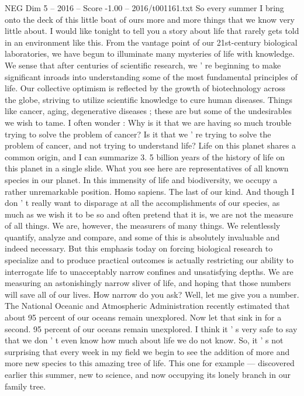 \begin{textsample}{NEG Dim 5 – 2016 – Score -1.00 – 2016/t001161.txt}
So every summer I bring onto the deck of this little boat of ours more and more things that we know very little about.
I would like tonight to tell you a story about life that rarely gets told in an environment like this.
From the vantage point of our 21st-century biological laboratories, we have begun to illuminate many mysteries of life with knowledge.
We sense that after centuries of scientific research, we ' re beginning to make significant inroads into understanding some of the most fundamental principles of life.
Our collective optimism is reflected by the growth of biotechnology across the globe, striving to utilize scientific knowledge to cure human diseases.
Things like cancer, aging, degenerative diseases ; these are but some of the undesirables we wish to tame.
I often wonder : Why is it that we are having so much trouble trying to solve the problem of cancer?
Is it that we ' re trying to solve the problem of cancer, and not trying to understand life?
Life on this planet shares a common origin, and I can summarize 3. 5 billion years of the history of life on this planet in a single slide.
What you see here are representatives of all known species in our planet.
In this immensity of life and biodiversity, we occupy a rather unremarkable position.
Homo sapiens.
The last of our kind.
And though I don ' t really want to disparage at all the accomplishments of our species, as much as we wish it to be so and often pretend that it is, we are not the measure of all things.
We are, however, the measurers of many things.
We relentlessly quantify, analyze and compare, and some of this is absolutely invaluable and indeed necessary.
But this emphasis today on forcing biological research to specialize and to produce practical outcomes is actually restricting our ability to interrogate life to unacceptably narrow confines and unsatisfying depths.
We are measuring an astonishingly narrow sliver of life, and hoping that those numbers will save all of our lives.
How narrow do you ask?
Well, let me give you a number.
The National Oceanic and Atmospheric Administration recently estimated that about 95 percent of our oceans remain unexplored.
Now let that sink in for a second. 95 percent of our oceans remain unexplored.
I think it ' s very safe to say that we don ' t even know how much about life we do not know.
So, it ' s not surprising that every week in my field we begin to see the addition of more and more new species to this amazing tree of life.
This one for example — discovered earlier this summer, new to science, and now occupying its lonely branch in our family tree.

\end{textsample}
